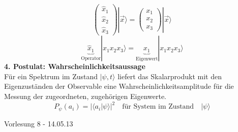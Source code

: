 \documentclass[10pt,article,colorback,accentcolor=tud9d]{scrartcl}
\begin{document}
    \begin{equation}
    \left(\begin{array}{c} \hat{x}_1 \\ \hat{x}_2 \\ \hat{x}_3 \end{array}\right)|\vec{x}\rangle=\left(\begin{array}{c} x_1 \\ x_2 \\ x_3 \end{array}\right)|\vec{x}\rangle
    \end{equation}
    \begin{equation}
    \underbrace{\hat{x}_1}_{\text{Operator}}|x_1x_2x_3\rangle=\underbrace{x_1}_{\text{Eigenwert}}|x_1x_2x_3\rangle
    \end{equation}
  \textbf{4. Postulat: Wahrscheinlichkeitsaussage}\\
    Für ein Spektrum im Zustand $|\psi,t\rangle$ liefert das Skalarprodukt mit den Eigenzuständen der Observable eine Wahrscheinlichkeitsamplitude für die Messung der zugeordneten, zugehörigen Eigenwerte.
    \begin{equation}
      P_\psi(a_i)=\left|\langle a_i|\psi\rangle\right|^2 \quad \text{für System im Zustand} \quad |\psi\rangle
    \end{equation}

\begin{flushright}
Vorlesung 8 - 14.05.13
\end{flushright}
 
\end{document}
